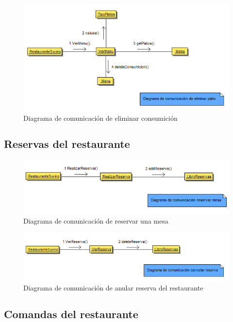 \documentclass[spanish,a4paper,11pt, twoside]{report}	%
\begin{document}
		\begin{figure}[!h]
		\centering
		\includegraphics[scale=0.5]{DCeliminarconsumicion.png}
		\caption{Diagrama de comunicación de eliminar consumición}
		\end{figure}

		\subsection{Reservas del restaurante}

		\begin{figure}[!h]
		\centering
		\includegraphics[scale=0.5]{DCreserva.png}
		\caption{Diagrama de comunicación de reservar una mesa}
		\end{figure}

		\begin{figure}[!h]
		\centering
		\includegraphics[scale=0.5]{DCeliminarreserva.png}
 		\caption{Diagrama de comunicación de anular reserva del restaurante}
		\end{figure}

		\subsection{Comandas del restaurante}
\end{document}
